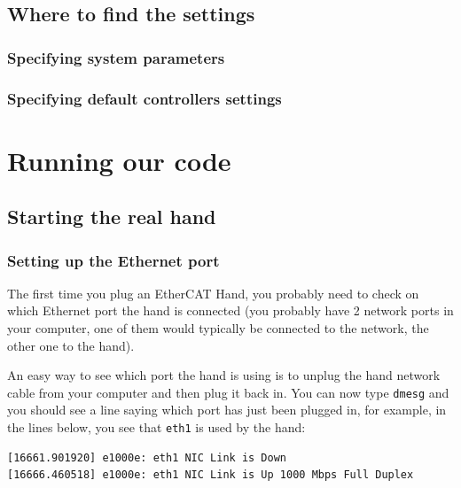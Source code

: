 \documentclass[12pt]{article}
\begin{document}
\subsection{Where to find the settings}
\label{sec:where-find-settings}

\subsubsection{Specifying system parameters}
\label{sec:spec-system-param}

\subsubsection{Specifying default controllers settings}
\label{sec:spec-defa-contr}

\newpage

\section{Running our code}
\label{sec:running-our-code}

\subsection{Starting the real hand}
\label{sec:starting-real-hand}

\subsubsection{Setting up the Ethernet port}
\par The first time you plug an EtherCAT Hand, you probably need to check on which Ethernet port the hand is connected (you probably have 2 network ports in your computer, one of them would typically be connected to the network, the other one to the hand).

\par An easy way to see which port the hand is using is to unplug the hand network cable from your computer and then plug it back in. You can now type \texttt{dmesg} and you should see a line saying which port has just been plugged in, for example, in the lines below, you see that \texttt{eth1} is used by the hand:
  \begin{lstlisting}[escapeinside='', language=Bash]
[16661.901920] e1000e: eth1 NIC Link is Down
[16666.460518] e1000e: eth1 NIC Link is Up 1000 Mbps Full Duplex
  \end{lstlisting}
\end{document}
